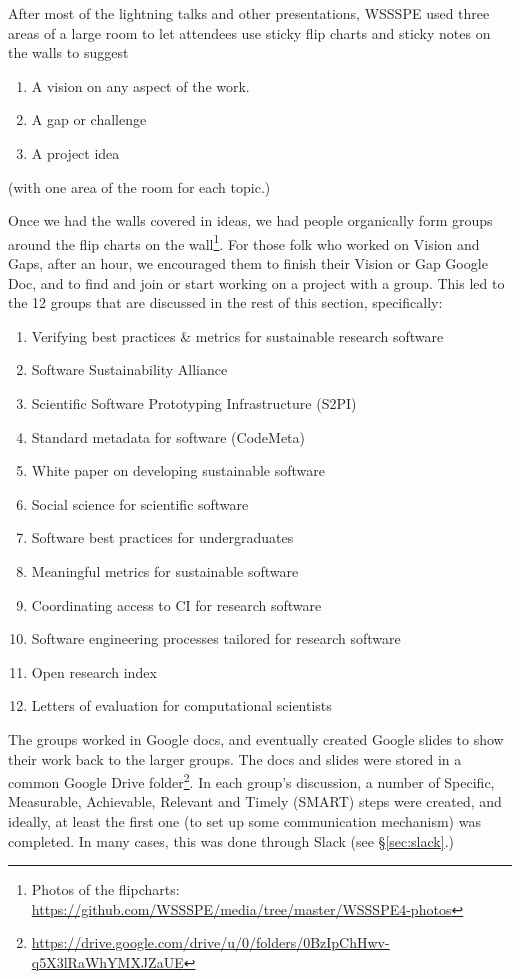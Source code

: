\documentclass[11pt, oneside]{amsart}
\begin{document}
After most of the lightning talks and other presentations, WSSSPE used three areas of a large room to let
attendees use sticky flip charts and sticky notes on the walls to suggest
\begin{enumerate}
\item A vision on any aspect of the work.
\item A gap or challenge
\item A project idea
\end{enumerate}
(with one area of the room for each topic.)

Once we had the walls covered in ideas, we had people organically form groups around the flip charts on the wall\footnote{Photos of the flipcharts: \url{https://github.com/WSSSPE/media/tree/master/WSSSPE4-photos}}. For those folk who worked on Vision and Gaps, after an hour, we encouraged them to finish their Vision or Gap Google Doc, and to find and join or start working on a project with a group. This led to the 12 groups that are discussed in the rest of this section, specifically:
\begin{enumerate}
\item Verifying best practices \& metrics for sustainable research software
\item Software Sustainability Alliance
\item Scientific Software Prototyping Infrastructure (S2PI)
\item Standard metadata for software (CodeMeta)
\item White paper on developing sustainable software
\item Social science for scientific software
\item Software best practices for undergraduates
\item Meaningful metrics for sustainable software
\item Coordinating access to CI for research software
\item Software engineering processes tailored for research software
\item Open research index
\item Letters of evaluation for computational scientists
\end{enumerate}


The groups worked in Google docs, and eventually created Google slides to show their work back to the larger groups. The docs and slides were stored in a common Google Drive folder\footnote{\url{https://drive.google.com/drive/u/0/folders/0BzIpChHwv-q5X3lRaWhYMXJZaUE}}. In each group's discussion, a number of Specific, Measurable, Achievable, Relevant and Timely (SMART) steps were created, and ideally, at least the first one (to set up some communication mechanism) was completed.  In many cases, this was done through Slack (see \S\ref{sec:slack}.)
\end{document}
